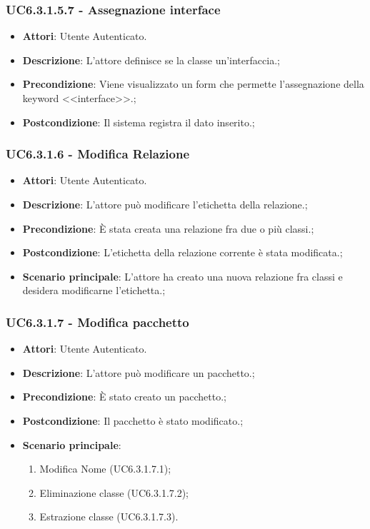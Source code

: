 \subsubsection{UC6.3.1.5.7 - Assegnazione interface} 
\label{sssec:UC6.3.1.5.7} 
\begin{itemize} 
\item \textbf{Attori}: Utente Autenticato.
\item \textbf{Descrizione}: L'attore definisce se la classe un'interfaccia.;
\item \textbf{Precondizione}: Viene visualizzato un form che permette l'assegnazione della keyword <<interface>>.;
\item \textbf{Postcondizione}: Il sistema registra il dato inserito.;
\end{itemize} 
\subsubsection{UC6.3.1.6 - Modifica Relazione} 
\label{sssec:UC6.3.1.6} 
\begin{itemize} 
\item \textbf{Attori}: Utente Autenticato.
\item \textbf{Descrizione}: L'attore può modificare l'etichetta della relazione.;
\item \textbf{Precondizione}: È stata creata una relazione fra due o più classi.;
\item \textbf{Postcondizione}: L'etichetta della relazione corrente è stata modificata.;
\item \textbf{Scenario principale}: L'attore ha creato una nuova relazione fra classi e desidera modificarne l'etichetta.;\end{itemize} 
\subsubsection{UC6.3.1.7 - Modifica pacchetto} 
\label{sssec:UC6.3.1.7} 
\begin{itemize} 
\item \textbf{Attori}: Utente Autenticato.
\item \textbf{Descrizione}: L'attore può modificare un pacchetto.;
\item \textbf{Precondizione}: È stato creato un pacchetto.;
\item \textbf{Postcondizione}: Il pacchetto è stato modificato.;
\item \textbf{Scenario principale}: \begin{enumerate}\item Modifica Nome (UC6.3.1.7.1);\item Eliminazione classe (UC6.3.1.7.2);\item Estrazione classe (UC6.3.1.7.3). 
 \end{enumerate}
\end{itemize} 
